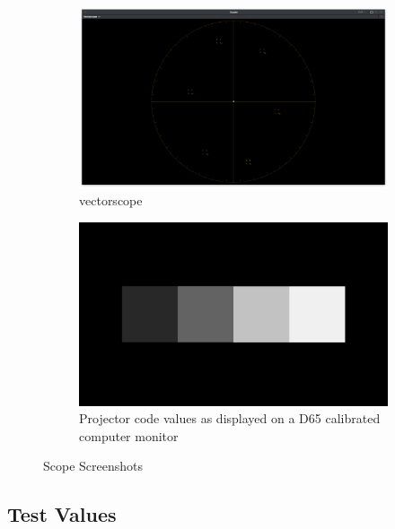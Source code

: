 \begin{figure}[ht!]
\begin{subfigure}[b]{0.475\textwidth}
            \includegraphics[width=\textwidth]{images/rec709/rec709_vectorscope}
            \caption[]%
            {{\small vectorscope}}    
            \label{fig:vect-rec709}
        \end{subfigure}
        \quad
        \begin{subfigure}[b]{0.475\textwidth}   
            \centering 
            \includegraphics[width=\textwidth]{images/rec709/rec709_image}
            \caption[Projector code values as displayed on a D65 calibrated computer monitor]%
            {{\small Projector code values as displayed on a D65 calibrated computer monitor}}    
            \label{fig:cv-rec709}
        \end{subfigure}
        \caption[]
        {\small \texttt{} Scope Screenshots} 
        \label{fig:screenshots-rec709}
    \end{figure}

\subsection{Test Values}
\label{subsec:testValues-rec709}

